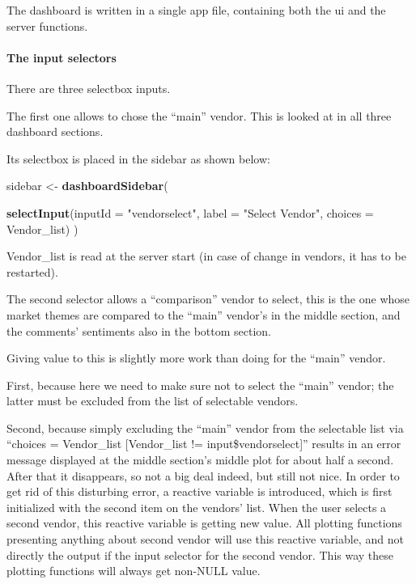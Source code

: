 \documentclass[]{article}
\newenvironment{Shaded}{\begin{snugshade}}{\end{snugshade}}
\newcommand{\KeywordTok}[1]{\textcolor[rgb]{0.13,0.29,0.53}{\textbf{{#1}}}}
\newcommand{\DataTypeTok}[1]{\textcolor[rgb]{0.13,0.29,0.53}{{#1}}}
\newcommand{\StringTok}[1]{\textcolor[rgb]{0.31,0.60,0.02}{{#1}}}
\newcommand{\NormalTok}[1]{{#1}}
\let\oldparagraph\paragraph
\renewcommand{\paragraph}[1]{\oldparagraph{#1}\mbox{}}
\begin{document}
The dashboard is written in a single app file, containing both the ui
and the server functions.

\paragraph{The input selectors}\label{the-input-selectors}

There are three selectbox inputs.

The first one allows to chose the ``main'' vendor. This is looked at in
all three dashboard sections.

Its selectbox is placed in the sidebar as shown below:

\begin{Shaded}
\begin{Highlighting}[]
\NormalTok{sidebar <-}\StringTok{ }\KeywordTok{dashboardSidebar}\NormalTok{(}
  
  \KeywordTok{selectInput}\NormalTok{(}\DataTypeTok{inputId =} \StringTok{"vendorselect"}\NormalTok{,}
              \DataTypeTok{label =} \StringTok{"Select Vendor"}\NormalTok{,}
              \DataTypeTok{choices =} \NormalTok{Vendor_list)}
  \NormalTok{)}
\end{Highlighting}
\end{Shaded}

Vendor\_list is read at the server start (in case of change in vendors,
it has to be restarted).

The second selector allows a ``comparison'' vendor to select, this is
the one whose market themes are compared to the ``main'' vendor's in the
middle section, and the comments' sentiments also in the bottom section.

Giving value to this is slightly more work than doing for the ``main''
vendor.

First, because here we need to make sure not to select the ``main''
vendor; the latter must be excluded from the list of selectable vendors.

Second, because simply excluding the ``main'' vendor from the selectable
list via ``choices = Vendor\_list {[}Vendor\_list !=
input\$vendorselect{]}'' results in an error message displayed at the
middle section's middle plot for about half a second. After that it
disappears, so not a big deal indeed, but still not nice. In order to
get rid of this disturbing error, a reactive variable is introduced,
which is first initialized with the second item on the vendors' list.
When the user selects a second vendor, this reactive variable is getting
new value. All plotting functions presenting anything about second
vendor will use this reactive variable, and not directly the output if
the input selector for the second vendor. This way these plotting
functions will always get non-NULL value.
\end{document}
